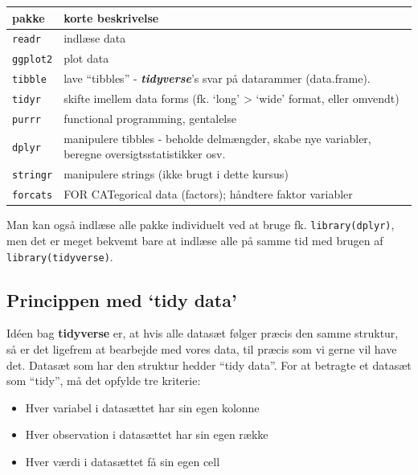 \documentclass[
]{book}
\providecommand{\tightlist}{%
  \setlength{\itemsep}{0pt}\setlength{\parskip}{0pt}}
\begin{document}
\begin{longtable}[]{@{}
  >{\raggedright\arraybackslash}p{}
  >{\raggedright\arraybackslash}p{}@{}}
\toprule
pakke & korte beskrivelse \\
\midrule
\endhead
\texttt{readr} & indlæse data \\
\texttt{ggplot2} & plot data \\
\texttt{tibble} & lave ``tibbles'' - \textbf{\emph{tidyverse}}'s svar på datarammer (data.frame). \\
\texttt{tidyr} & skifte imellem data forms (fk. `long' \textgreater{} `wide' format, eller omvendt) \\
\texttt{purrr} & functional programming, gentalelse \\
\texttt{dplyr} & manipulere tibbles - beholde delmængder, skabe nye variabler, beregne oversigtsstatistikker osv. \\
\texttt{stringr} & manipulere strings (ikke brugt i dette kursus) \\
\texttt{forcats} & FOR CATegorical data (factors); håndtere faktor variabler \\
\bottomrule
\end{longtable}

Man kan også indlæse alle pakke individuelt ved at bruge fk. \texttt{library(dplyr)}, men det er meget bekvemt bare at indlæse alle på samme tid med brugen af \texttt{library(tidyverse)}.

\hypertarget{princippen-med-tidy-data}{%
\subsection{Princippen med `tidy data'}\label{princippen-med-tidy-data}}

Idéen bag \textbf{tidyverse} er, at hvis alle datasæt følger præcis den samme struktur, så er det ligefrem at bearbejde med vores data, til præcis som vi gerne vil have det. Datasæt som har den struktur hedder ``tidy data''. For at betragte et datasæt som ``tidy'', må det opfylde tre kriterie:

\begin{itemize}
\tightlist
\item
  Hver variabel i datasættet har sin egen kolonne
\item
  Hver observation i datasættet har sin egen række
\item
  Hver værdi i datasættet få sin egen cell
\end{itemize}
\end{document}

